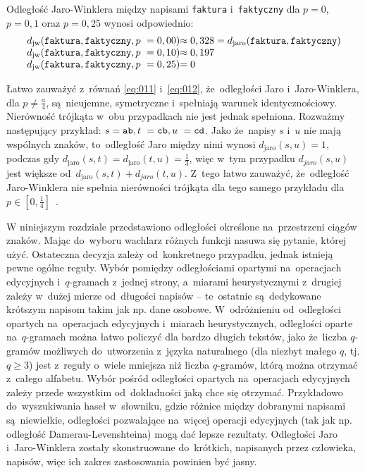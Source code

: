 \documentclass{praca1}
\begin{document}
\begin{example}
Odległość Jaro-Winklera między napisami \verb|faktura| i~\verb|faktyczny| dla $p = 0$, $p = 0,1$ oraz $p = 0,25$ wynosi odpowiednio: 
\begin{equation*}
  \left.\begin{array}{l@{}l}
    d_{\mathrm{jw}}(\verb|faktura|, \verb|faktyczny|, p~= 0,00) & \approx 0,328 = d_{\mathrm{jaro}}(\verb|faktura|, \verb|faktyczny|) \\
    d_{\mathrm{jw}}(\verb|faktura|, \verb|faktyczny|, p~= 0,10) & \approx 0,197  \\
    d_{\mathrm{jw}}(\verb|faktura|, \verb|faktyczny|, p~= 0,25) & =  0
  \end{array}\right.
\end{equation*}
\end{example}

Łatwo zauważyć z~równań \eqref{eq:011} i~\eqref{eq:012}, że~odległości Jaro i~Jaro-Winklera, dla $p \neq \frac{a}{4}$, są~nieujemne,  symetryczne i~spełniają warunek identycznościowy. Nierówność trójkąta w~obu przypadkach nie jest jednak spełniona. Rozważmy następujący przykład: $s = \verb|ab|, t~= \verb|cb|, u~= \verb|cd|$. Jako że~napisy $s$ i~$u$ nie mają wspólnych znaków, to~odległość Jaro między nimi wynosi $d_{\mathrm{jaro}}(s, u) = 1$, podczas gdy $d_{\mathrm{jaro}}(s, t) = d_{\mathrm{jaro}}(t, u) = \frac{1}{3}$, więc w~tym przypadku $d_{jaro}(s, u)$ jest większe od~$d_{\mathrm{jaro}}(s, t) + d_{jaro}(t, u)$. Z~tego łatwo zauważyć, że~odległość Jaro-Winklera nie spełnia nierówności trójkąta  dla tego samego przykładu dla $p \in [0, \frac{1}{4}]$~\cite{Loo2014:stringdist}.


W niniejszym rozdziale przedstawiono odległości określone na~przestrzeni ciągów znaków. Mając do~wyboru wachlarz różnych funkcji nasuwa się pytanie, której użyć. Ostateczna decyzja zależy od~konkretnego przypadku, jednak istnieją pewne ogólne reguły. Wybór pomiędzy odległościami opartymi na~operacjach edycyjnych i~$q$-gramach z~jednej strony, a~miarami heurystycznymi z~drugiej zależy w~dużej mierze od~długości napisów -- te~ostatnie są~dedykowane krótszym napisom takim jak np. dane osobowe. W~odróżnieniu od~odległości opartych na~operacjach edycyjnych i~miarach heurystycznych, odległości oparte na~$q$-gramach można łatwo policzyć dla bardzo długich tekstów, jako że~liczba $q$-gramów możliwych do~utworzenia z~języka naturalnego (dla niezbyt małego $q$, tj. $q \geq 3$) jest z~reguły o~wiele mniejsza niż liczba $q$-gramów, którą można otrzymać z~całego alfabetu. Wybór pośród odległości opartych na~operacjach edycyjnych zależy przede wszystkim od~dokładności jaką chce się otrzymać. Przykładowo do~wyszukiwania haseł w~słowniku, gdzie różnice między dobranymi napisami są~niewielkie, odległości pozwalające na~więcej operacji edycyjnych (tak jak np. odległość Damerau-Levenshteina) mogą dać lepsze rezultaty. Odległości Jaro i~Jaro-Winklera zostały skonstruowane do~krótkich, napisanych przez człowieka, napisów, więc ich zakres zastosowania powinien być jasny.
\end{document}
